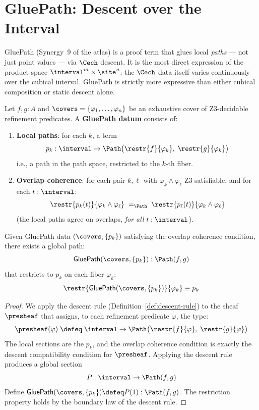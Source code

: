 \section{GluePath: Descent over the Interval}
\label{sec:gluepath}

GluePath (Synergy~9 of the atlas) is a proof term that glues local
\emph{paths} --- not just point values --- via $\Cech$ descent.  It
is the most direct expression of the product space $\interval^m \times
\site^n$: the $\Cech$ data itself varies continuously over the cubical
interval.  GluePath is strictly more expressive than either cubical
composition or static descent alone.

\begin{definition}
\label{def:gluepath-data}
Let $f, g : A$ and $\covers = \{\varphi_1, \ldots, \varphi_n\}$ be an
exhaustive cover of Z3-decidable refinement predicates.  A
\textbf{GluePath datum} consists of:
\begin{enumerate}
\item \textbf{Local paths}: for each $k$, a term
  \[
    p_k : \interval \to \Path\bigl(\restr{f}{\varphi_k},\;
    \restr{g}{\varphi_k}\bigr)
  \]
  i.e., a path in the path space, restricted to the $k$-th fiber.

\item \textbf{Overlap coherence}: for each pair $k, \ell$ with
  $\varphi_k \wedge \varphi_\ell$ Z3-satisfiable, and for each
  $t : \interval$:
  \[
    \restr{p_k(t)}{\varphi_k \wedge \varphi_\ell}
    \;=_{\Path}\;
    \restr{p_\ell(t)}{\varphi_k \wedge \varphi_\ell}
  \]
  (the local paths agree on overlaps, \emph{for all} $t : \interval$).
\end{enumerate}
\end{definition}

\begin{theorem}
\label{thm:gluepath}
Given GluePath data $(\covers, \{p_k\})$ satisfying the overlap coherence
condition, there exists a global path:
\[
  \mathsf{GluePath}(\covers, \{p_k\}) : \Path(f, g)
\]
that restricts to $p_k$ on each fiber $\varphi_k$:
\[
  \restr{\mathsf{GluePath}(\covers, \{p_k\})}{\varphi_k} \equiv p_k
\]
\end{theorem}

\begin{proof}
We apply the descent rule (Definition~\ref{def:descent-rule}) to the
sheaf $\presheaf$ that assigns, to each refinement predicate $\varphi$,
the type:
\[
  \presheaf(\varphi) \;\defeq\; \interval \to \Path\bigl(\restr{f}{\varphi},\;
  \restr{g}{\varphi}\bigr)
\]
The local sections are the $p_k$, and the overlap coherence condition is
exactly the descent compatibility condition for $\presheaf$.  Applying
the descent rule produces a global section
\[
  P : \interval \to \Path(f, g)
\]
Define $\mathsf{GluePath}(\covers, \{p_k\}) \defeq P(1) : \Path(f, g)$.
The restriction property holds by the boundary law of the descent rule.
\end{proof}

